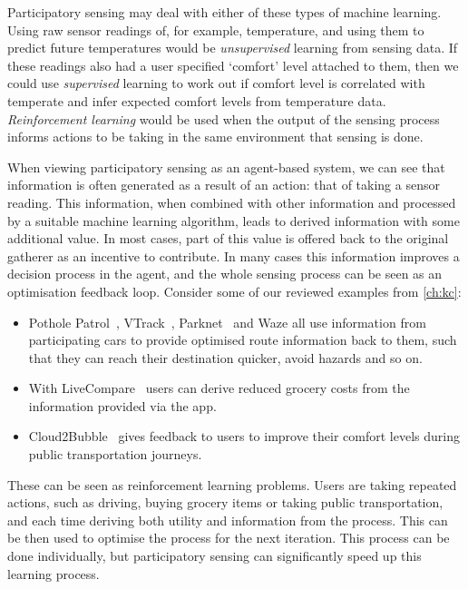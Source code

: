 Participatory sensing may deal with either of these types of machine learning.
Using raw sensor readings of, for example, temperature, and using them to
predict future temperatures would be \emph{unsupervised} learning from sensing
data. If these readings also had a user specified `comfort' level attached to
them, then we could use \emph{supervised} learning to work out if comfort
level is correlated with temperate and infer expected comfort levels from
temperature data. \emph{Reinforcement learning} would be used when the output
of the sensing process informs actions to be taking in the same environment
that sensing is done.

When viewing participatory sensing as an agent-based system, we can see that
information is often generated as a result of an action: that of taking a sensor
reading. This information, when combined with other information and processed
by a suitable machine learning algorithm, leads to derived information with
some additional value. In most cases, part of this value is offered back to
the original gatherer as an incentive to contribute. In many cases this
information improves a decision process in the agent, and the whole sensing
process can be seen as an optimisation feedback loop. Consider some of our
reviewed examples from \autoref{ch:kc}:

\begin{itemize}
\item Pothole Patrol~\citep{Eriksson2008}, VTrack~\citep{Thiagarajan2009}, Parknet~\citep{Mathur2010} and Waze all use information from participating cars to provide optimised route information back to them, such that they can reach their destination quicker, avoid hazards and so on.
\item With LiveCompare~\citep{Deng2009} users can derive reduced grocery costs from the information provided via the app.
\item Cloud2Bubble~\citep{Costa2012} gives feedback to users to improve their comfort levels during public transportation journeys.
\end{itemize}

These can be seen as reinforcement learning problems. Users are taking
repeated actions, such as driving, buying grocery items or taking public
transportation, and each time deriving both utility and information from the
process. This can be then used to optimise the process for the next iteration.
This process can be done individually, but participatory sensing can
significantly speed up this learning process.

